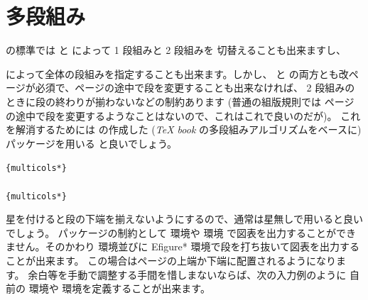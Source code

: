 

\section{多段組み\texorpdfstring{\zdash}{---}}

\LaTeXe の標準では  と  によって 1 段組みと 2 段組みを
切替えることも出来ますし、
によって全体の段組みを指定することも出来ます。しかし、  と 
の両方とも改ページが必須で、ページの途中で段を変更することも出来なければ、
2 段組みのときに段の終わりが揃わないなどの制約あります (普通の組版規則では
ページの途中で段を変更するようなことはないので、これはこれで良いのだが)。
これを解消するためには の作成した (\emph{\TeX
book} の多段組みアルゴリズムをベースに)  パッケージを用いる
と良いでしょう。%
\begin{Syntax}
\verb|{multicols*}|\\
\\
\verb|{multicols*}|
\end{Syntax}
星を付けると段の下端を揃えないようにするので、通常は星無しで用いると良いでしょう。
 パッケージの制約として  環境や  環境
で図表を出力することができません。そのかわり  環境並びに
E{figure*} 環境で段を打ち抜いて図表を出力することが出来ます。
この場合はページの上端か下端に配置されるようになります。
余白等を手動で調整する手間を惜しまないならば、次の入力例のように
自前の  環境や  環境を定義することが出来ます。
%
